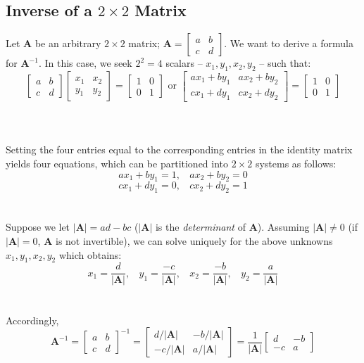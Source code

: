 \documentclass[../setup.tex]{subfiles}
\begin{document}
\subsection{Inverse of a $2 \times 2$ Matrix}
Let $\bm{A}$ be an arbitrary $2 \times 2$ matrix; $\bm{A} = \begin{bmatrix}a & b \\ c & d \end{bmatrix}$. We want to derive a formula for $\bm{A}^{-1}$. In this case, we seek $2^2 = 4$ scalars -- $x_1, y_1, x_2, y_2$ -- such that:
\[\begin{bmatrix}a & b \\ c & d \end{bmatrix} \begin{bmatrix}x_1 & x_2 \\ y_1 & y_2 \end{bmatrix} = \begin{bmatrix}1 & 0 \\ 0 & 1 \end{bmatrix} \text{ or } \begin{bmatrix}ax_1 + by_1 & ax_2 + by_2 \\ cx_1 + dy_1 & cx_2 + dy_2 \end{bmatrix} = \begin{bmatrix}1 & 0 \\ 0 & 1 \end{bmatrix}\] \\
\phantom \\ \\
Setting the four entries equal to the corresponding entries in the identity matrix yields four equations, which can be partitioned into $2 \times 2$ systems as follows:
\[ax_1 + by_1 = 1, \ \ \ \ ax_2 + by_2 = 0\]
\[cx_1 + dy_1 = 0, \ \ \ \ cx_2 + dy_2 = 1\]
\phantom \\ \\
Suppose we let $|\bm{A}| = ad - bc$ ($|\bm{A}|$ is the \textit{determinant} of $\bm{A}$). Assuming $|\bm{A}| \neq 0$ (if $|\bm{A}| = 0$, $\bm{A}$ is not invertible), we can solve uniquely for the above unknowns $x_1, y_1, x_2, y_2$ which obtains:
\[x_1 = \frac{d}{|\bm{A}|}, \ \ \ \ y_1 = \frac{-c}{|\bm{A}|}, \ \ \ \ x_2 = \frac{-b}{|\bm{A}|}, \ \ \ \ y_2 = \frac{a}{|\bm{A}|}\]
\phantom \\ \\
Accordingly,
\[\bm{A}^{-1} = \begin{bmatrix}a & b \\ c & d \end{bmatrix}^{-1} = \begin{bmatrix}d/|\bm{A}| & -b/|\bm{A}| \\ -c/|\bm{A}| & a/|\bm{A}| \end{bmatrix} = \frac{1}{|\bm{A}|}\begin{bmatrix}d & -b \\ -c & a \end{bmatrix}\] 
\end{document}
